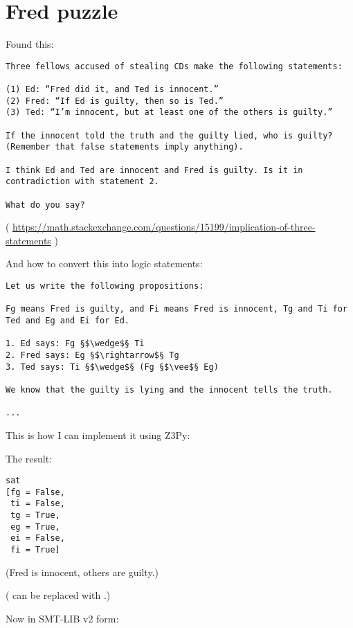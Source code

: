 \section{Fred puzzle}

Found this:

\begin{lstlisting}
Three fellows accused of stealing CDs make the following statements:

(1) Ed: “Fred did it, and Ted is innocent.”
(2) Fred: “If Ed is guilty, then so is Ted.”
(3) Ted: “I’m innocent, but at least one of the others is guilty.”

If the innocent told the truth and the guilty lied, who is guilty? (Remember that false statements imply anything).

I think Ed and Ted are innocent and Fred is guilty. Is it in contradiction with statement 2.

What do you say?
\end{lstlisting}

( \url{https://math.stackexchange.com/questions/15199/implication-of-three-statements} )

And how to convert this into logic statements:

\begin{lstlisting}
Let us write the following propositions:

Fg means Fred is guilty, and Fi means Fred is innocent, Tg and Ti for Ted and Eg and Ei for Ed.

1. Ed says: Fg §$\wedge$§ Ti
2. Fred says: Eg §$\rightarrow$§ Tg
3. Ted says: Ti §$\wedge$§ (Fg §$\vee$§ Eg)

We know that the guilty is lying and the innocent tells the truth.

...

\end{lstlisting}

This is how I can implement it using Z3Py:



The result:

\begin{lstlisting}
sat
[fg = False,
 ti = False,
 tg = True,
 eg = True,
 ei = False,
 fi = True]
\end{lstlisting}

(Fred is innocent, others are guilty.)

( can be replaced with .)

Now in SMT-LIB v2 form:

